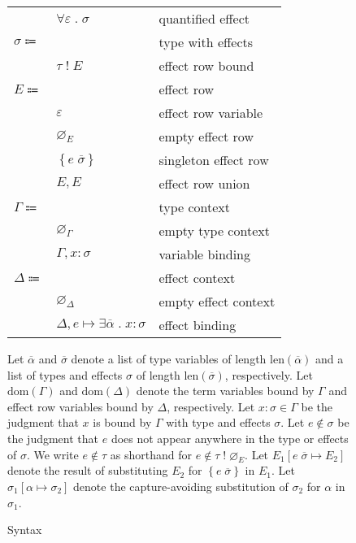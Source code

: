 \documentclass[12pt]{article}
\newcommand\parens[1]{\left( #1 \right)} %
\newcommand\lstof[1]{\overline{#1}}
\newcommand\lstlen[1]{\text{len}\parens{\lstof{#1}}}
\newcommand\evar{x}
\newcommand\ttype{\tau}
\newcommand\tvar{\alpha}
\newcommand\txforall[2]{\forall #1 \; . \; #2} %
\newcommand\tx{\sigma}
\newcommand\twithx[2]{#1 \; ! \; #2} %
\newcommand\tanno[2]{#1 : #2} %
\newcommand\tsub[3]{#1 \left[ #2 \mapsto #3 \right]} %
\newcommand\xeffects{E}
\newcommand\xvar{\varepsilon}
\newcommand\xempty{\varnothing_{\xeffects}}
\newcommand\xtapp[2]{#1 \; \lstof{#2}}
\newcommand\xsingleton[1]{\left\{ #1 \right\}}
\newcommand\xunion[2]{#1, #2}
\newcommand\xeffect{e}
\newcommand\xnotint[2]{#1 \notin #2} %
\newcommand\xsub[3]{#1 \left[ #2 \mapsto #3 \right]} %
\newcommand\ccontext{\Gamma}
\newcommand\cempty{\varnothing_{\ccontext}}
\newcommand\cextend[2]{#1, #2}
\newcommand\cdom[1]{\text{dom}\parens{#1}}
\newcommand\dcontext{\Delta}
\newcommand\dempty{\varnothing_{\dcontext}}
\newcommand\dextend[2]{#1, #2}
\newcommand\deffect[4]{#1 \mapsto \exists #2 \; . \; \tanno{#3}{#4}} %
\newcommand\ddom[1]{\text{dom}\parens{#1}}
\begin{document}
\begin{figure}
\begin{mdframed}[backgroundcolor=none]
\begin{center}
\begin{tabular}{l l l}
          & $\txforall{\xvar}{\tx}$ & quantified effect \\
          $\tx \Coloneqq$ & & type with effects \\
          & $\twithx{\ttype}{\xeffects}$ & effect row bound \\
          $\xeffects \Coloneqq$ & & effect row \\
          & $\xvar$ & effect row variable \\
          & $\xempty$ & empty effect row \\
          & $\xsingleton{\xtapp{\xeffect}{\tx}}$ & singleton effect row \\
          & $\xunion{\xeffects}{\xeffects}$ & effect row union \\
          $\ccontext \Coloneqq$ & & type context \\
          & $\cempty$ & empty type context \\
          & $\cextend{\ccontext}{\tanno{\evar}{\tx}}$ & variable binding \\
          $\dcontext \Coloneqq$ & & effect context \\
          & $\dempty$ & empty effect context \\
          & $\dextend{\dcontext}{\deffect{\xeffect}{\lstof{\tvar}}{\evar}{\tx}}$ & effect binding \\
        \end{tabular}
      \end{center}

      \bigskip

      Let $\lstof{\tvar}$ and $\lstof{\tx}$ denote a list of type variables of length $\lstlen{\tvar}$ and a list of types and effects $\tx$ of length $\lstlen{\tx}$, respectively. Let $\cdom{\ccontext}$ and $\ddom{\dcontext}$ denote the term variables bound by $\ccontext$ and effect row variables bound by $\dcontext$, respectively. Let $\tanno{\evar}{\tx} \in \ccontext$ be the judgment that $\evar$ is bound by $\ccontext$ with type and effects $\tx$. Let $\xnotint{\xeffect}{\tx}$ be the judgment that $\xeffect$ does not appear anywhere in the type or effects of $\tx$. We write $\xnotint{\xeffect}{\ttype}$ as shorthand for $\xnotint{\xeffect}{\twithx{\ttype}{\xempty}}$. Let $\xsub{\xeffects_1}{\xtapp{\xeffect}{\tx}}{\xeffects_2}$ denote the result of substituting $\xeffects_2$ for $\xsingleton{\xtapp{\xeffect}{\tx}}$ in $\xeffects_1$. Let $\tsub{\tx_1}{\tvar}{\tx_2}$ denote the capture-avoiding substitution of $\tx_2$ for $\tvar$ in $\tx_1$.

      \caption{Syntax}\label{fig:syntax}
    \end{mdframed}
  \end{figure}
\end{document}
